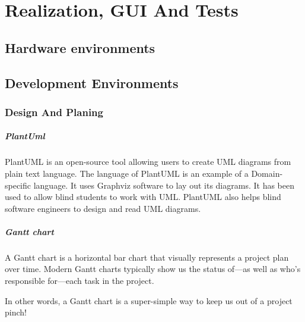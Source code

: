 

\setcounter{mtc}{11}

\chapter{Realization, GUI And Tests}%
\label{chap:chapter_four}
\minitoc

\section{Hardware environments}


\section{Development Environments}
\subsection{Design And Planing}

\paragraph{PlantUml}
PlantUML is an open-source tool allowing users to create UML diagrams from plain text language. The language of PlantUML is an example of a Domain-specific language. It uses Graphviz software to lay out its diagrams. It has been used to allow blind students to work with UML. PlantUML also helps blind software engineers to design and read UML diagrams.


\paragraph{Gantt chart}
A Gantt chart is a horizontal bar chart that visually represents a project plan over time. Modern Gantt charts typically show us the status of—as well as who’s responsible for—each task in the project.

In other words, a Gantt chart is a super-simple way to keep us out of a project pinch!

